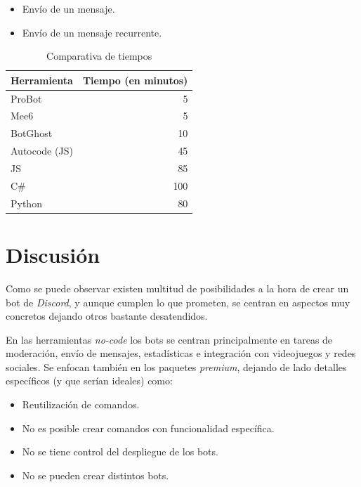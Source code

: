 \begin{itemize}
	\item Envío de un mensaje.
	\item Envío de un mensaje recurrente.
\end{itemize}

\begin{table}[H]
    \centering
    \def\arraystretch{1.25}
    \begin{adjustbox}{max width=\textwidth}
    \begin{tabularx}{200px}{|l|R|}
    \hline
        \textbf{Herramienta} & \textbf{Tiempo (en minutos)} \\ \hline
    \hline
        ProBot & 5 \\ \hline
        Mee6 & 5 \\ \hline
        BotGhost & 10 \\ \hline
    \hline
        Autocode (JS) & 45 \\ \hline
    \hline
        JS & 85 \\ \hline
        C\# & 100 \\ \hline
        Python & 80 \\ \hline
    \end{tabularx}
    \end{adjustbox}
    \caption{Comparativa de tiempos}
\end{table}

\section{Discusión}

Como se puede observar existen multitud de posibilidades a la hora de crear un bot de \textit{Discord}, y aunque cumplen lo que prometen, se centran en aspectos muy concretos dejando otros bastante desatendidos.

En las herramientas \textit{no-code} los bots se centran principalmente en tareas de moderación, envío de mensajes, estadísticas e integración con videojuegos y redes sociales. Se enfocan también en los paquetes \textit{premium}, dejando de lado detalles específicos (y que serían ideales) como:

\begin{itemize}
	\item Reutilización de comandos.
	\item No es posible crear comandos con funcionalidad específica.
	\item No se tiene control del despliegue de los bots.
	\item No se pueden crear distintos bots.
\end{itemize}

